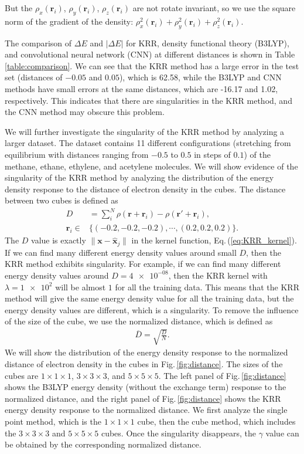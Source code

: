 \documentclass[%
twocolumn,
amsmath,amssymb,
groupedaddress,
reprint,%
]{revtex4-2}
\renewcommand{\>}{\rangle}
\newcommand{\<}{\langle}
\newcommand{\nl}{\nonumber \\}
\newcommand{\eq}[1]{Eq.\,(\ref{#1})}
\newcommand{\Fig}[1]{Fig.\,\ref{#1}}
\newcommand{\Tab}[1]{Table \ref{#1}}
\begin{document}
But the $\rho_{x} (\mathbf{r}_{i})$, $\rho_{y} (\mathbf{r}_{i})$, $\rho_{z} (\mathbf{r}_{i})$ are not rotate invariant, so we use the square norm of the gradient of the density: $\rho_{x}^{2} (\mathbf{r}_{i}) + \rho_{y}^{2} (\mathbf{r}_{i}) + \rho_{z}^{2} (\mathbf{r}_{i})$.

The comparison of $\Delta E$ and $|\Delta E|$ for KRR, density functional theory (B3LYP), and convolutional neural network (CNN) at different distances is shown in \Tab{table:comparison}.
% 
We can see that the KRR method has a large error in the test set (distances of $-0.05$ and $0.05$), which is 62.58, while the B3LYP and CNN methods have small errors at the same distances, which are -16.17 and 1.02, respectively.
% 
This indicates that there are singularities in the KRR method, and the CNN method may obscure this problem.

We will further investigate the singularity of the KRR method by analyzing a larger dataset.
% 
The dataset contains 11 different configurations (stretching from equilibrium with distances ranging from $-0.5$ to $0.5$ in steps of $0.1$) of the methane, ethane, ethylene, and acetylene molecules.
% 
We will show evidence of the singularity of the KRR method by analyzing the distribution of the energy density response to the distance of electron density in the cubes.
% 
The distance between two cubes is defined as
\begin{align}
	D                  & = \sum_{i}^{N} \rho(\mathbf{r} + \mathbf{r}_{i}) - \rho(\mathbf{r}' + \mathbf{r}_{i}), \nl
	\mathbf{r}_{i} \in & \{(-0.2, -0.2, -0.2), \cdots, (0.2, 0.2, 0.2)\}.
\end{align}
% 
The $D$ value is exactly $\|\bm{x} - \bm{\hat{x}}_{j}\|$ in the kernel function, \eq{eq:KRR_kernel}.
% 
If we can find many different energy density values around small $D$, then the KRR method exhibits singularity.
% 
For example, if we can find many different energy density values around $D = \num{4e-08}$, then the KRR kernel with $\lambda = \num{1e2}$ will be almost $1$ for all the training data.
% 
This means that the KRR method will give the same energy density value for all the training data, but the energy density values are different, which is a singularity.
% 
To remove the influence of the size of the cube, we use the normalized distance, which is defined as
\begin{align}
	\overline{D} = \sqrt{\frac{D}{N}}.
\end{align}
% 
We will show the distribution of the energy density response to the normalized distance of electron density in the cubes in \Fig{fig:distance}. The sizes of the cubes are $1 \times 1 \times 1$, $3 \times 3 \times 3$, and $5 \times 5 \times 5$.
% 
The left panel of \Fig{fig:distance} shows the B3LYP energy density (without the exchange term) response to the normalized distance, and the right panel of \Fig{fig:distance} shows the KRR energy density response to the normalized distance.
% 
We first analyze the single point method, which is the $1 \times 1 \times 1$ cube, then the cube method, which includes the $3 \times 3 \times 3$ and $5 \times 5 \times 5$ cubes. Once the singularity disappears, the $\gamma$ value can be obtained by the corresponding normalized distance.
% 
\end{document}
